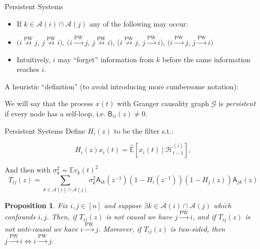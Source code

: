 \documentclass{beamer} %
\newtheorem*{proposition}{Proposition}
\def\E{\mathbb{E}}  %
\def\pwgc{\overset{\text{PW}}{\rightarrow}}  %
\def\npwgc{\overset{\text{PW}}{\nrightarrow}}  %
\def\gcg{\mathcal{G}}  %
\def\B{\mathsf{B}}  %
\def\A{\mathsf{A}}  %
\def\H{\mathcal{H}}  %
\newcommand{\linE}[2]{\hat{\E}[#1\ |\ #2]}  %
\newcommand{\anc}[1]{\mathcal{A}(#1)}  %
\begin{document}
\begin{frame}{Persistent Systems}
  \begin{itemize}
    \item{If $k \in \anc{i}\cap\anc{j}$ any of the following may occur:}\pause
    \item{
        $(i \npwgc j$, $j \npwgc i)$,
        $(i \pwgc j$, $j \npwgc i)$,
        $(i \npwgc j$, $j \pwgc i)$,
        $(i \pwgc j$, $j \pwgc i)$}\pause
    \item{Intuitively, $i$ may ``forget'' information from $k$ before the same information reaches $i$.}\pause
  \end{itemize}

  A heuristic ``definition'' (to avoid introducing more cumbersome notation):
  \begin{definition}[Persistent]
    We will say that the process $x(t)$ with Granger causality graph
    $\gcg$ is \textit{persistent} if every node has a self-loop,
    i.e. $\B_{ii}(z) \ne 0$.
  \end{definition}
\end{frame}

\begin{frame}{Persistent Systems}
  Define $H_i(z)$ to be the filter s.t.:
  
  \begin{equation*}
    H_i(z)x_i(t) = \linE{x_i(t)}{\H_{t - 1}^{(i)}},
  \end{equation*}\pause

  And then with $\sigma_k^2 = \E v_k(t)^2$
  \begin{equation*}
    \label{eqn:T_filter}
    T_{ij}(z) = \sum_{k \in \anc{i} \cap \anc{j}}\sigma_k^2\A_{ik}(z^{-1})(1 - H_i(z^{-1}))(1 - H_j(z))\A_{jk}(z)
  \end{equation*}\pause

  \begin{proposition}
    \label{prop:persistence_converse}
    Fix $i, j \in [n]$ and suppose $\exists k \in \anc{i} \cap \anc{j}$
    which confounds $i, j$.  Then, if $T_{ij}(z)$ is not causal we have
    $j \pwgc i$, and if $T_{ij}(z)$ is not anti-causal we have
    $i \pwgc j$.  Moreover, if $T_{ij}(z)$ is two-sided, then $j \pwgc i \iff i \pwgc j$.
  \end{proposition}
\end{frame}
\end{document}

